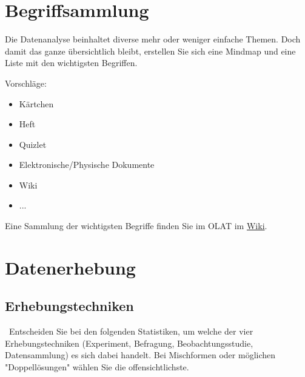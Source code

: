 



\renewcommand{\metaHeaderLine}{Arbeitsblatt}
\renewcommand{\arbeitsblattTitel}{Diagramme Lesen (V 0.1)}





\arbeitsblattHeader{}


\section*{Begriffsammlung}
Die Datenanalyse beinhaltet diverse mehr oder weniger einfache Themen. Doch damit das ganze übersichtlich bleibt, erstellen Sie sich eine Mindmap und eine Liste mit den wichtigsten Begriffen.

Vorschläge:

\begin{itemize}
\item Kärtchen
\item Heft
\item Quizlet
\item Elektronische/Physische Dokumente
\item Wiki
\item ...
\end{itemize}

Eine Sammlung der wichtigsten Begriffe finden Sie im OLAT im \href{https://olat.bms-w.ch/auth/RepositoryEntry/5242983/path%3DIndex/0}{Wiki}.

\newpage
\section{Datenerhebung}
\subsection{Erhebungstechniken}\
Entscheiden Sie bei den folgenden Statistiken, um welche der vier Erhebungstechniken (Experiment, Befragung, Beobachtungsstudie, Datensammlung) es 
sich dabei handelt. Bei Mischformen oder möglichen "Doppellösungen"
wählen Sie die offensichtlichste. \TRAINER{}

